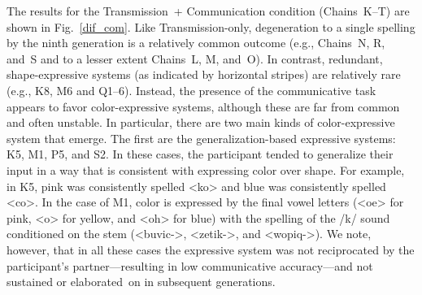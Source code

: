 \documentclass[doc,biblatex]{apa7}
\begin{document}
The results for the Transmission~+ Communication condition (Chains~K--T) are shown in Fig.~\ref{dif_com}. Like Transmission-only, degeneration to a single spelling by the ninth generation is a relatively common outcome (e.g., Chains~N, R, and~S and to a lesser extent Chains~L, M, and~O). In contrast, redundant, shape-expressive systems (as indicated by horizontal stripes) are relatively rare (e.g., K8, M6 and Q1--6). Instead, the presence of the communicative task appears to favor color-expressive systems, although these are far from common and often unstable. In particular, there are two main kinds of color-expressive system that emerge. The first are the generalization-based expressive systems: K5, M1, P5, and S2. In these cases, the participant tended to generalize their input in a way that is consistent with expressing color over shape. For example, in K5, pink was consistently spelled <ko> and blue was consistently spelled <co>. In the case of M1, color is expressed by the final vowel letters (<oe> for pink, <o> for yellow, and <oh> for blue) with the spelling of the /k/ sound conditioned on the stem (<buvic->, <zetik->, and <wopiq->). We note, however, that in all these cases the expressive system was not reciprocated by the participant's partner---resulting in low communicative accuracy---and not sustained or elaborated~on in subsequent generations.
\end{document}

